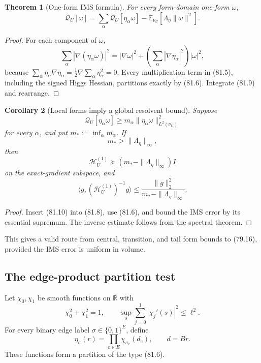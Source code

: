 \documentclass[11pt]{article}
\newtheorem{theorem}{Theorem}[section]
\newtheorem{corollary}[theorem]{Corollary}
\theoremstyle{remark}
\begin{document}
\begin{theorem}[One-form IMS formula]
\label{thm:v17v81-ims}
For every form-domain one-form \(\omega\),
\[
\boxed{
 \mathcal Q_U[\omega]
 =\sum_\alpha\mathcal Q_U[\eta_\alpha\omega]
 -\mathbb E_{\nu_U}[\Lambda_\eta\|\omega\|^2].} \tag{81.8}
\]
\end{theorem}

\begin{proof}
For each component of \(\omega\),
\[
 \sum_\alpha|\nabla(\eta_\alpha\omega)|^2
 =|\nabla\omega|^2+
 \left(\sum_\alpha|\nabla\eta_\alpha|^2\right)|\omega|^2,       \tag{81.9}
\]
because \(\sum_\alpha\eta_\alpha\nabla\eta_\alpha
=\frac12\nabla\sum_\alpha\eta_\alpha^2=0\).  Every multiplication
term in (81.5), including the signed Higgs Hessian, partitions exactly
by (81.6).  Integrate (81.9) and rearrange.
\end{proof}

\begin{corollary}[Local forms imply a global resolvent bound]
\label{cor:v17v81-local}
Suppose
\[
 \mathcal Q_U[\eta_\alpha\omega]
 \geq m_\alpha\|\eta_\alpha\omega\|_{L^2(\nu_U)}^2              \tag{81.10}
\]
for every \(\alpha\), and put
\(m_*:=\inf_\alpha m_\alpha\).  If
\[
 m_* > \|\Lambda_\eta\|_\infty,                 \tag{81.11}
\]
then
\[
 \mathscr H_U^{(1)}
 \succeq(m_*-\|\Lambda_\eta\|_\infty)I          \tag{81.12}
\]
on the exact-gradient subspace, and
\[
 \langle g,(\mathscr H_U^{(1)})^{-1}g\rangle
 \leq
 \frac{\|g\|_2^2}{m_*-\|\Lambda_\eta\|_\infty}.                 \tag{81.13}
\]
\end{corollary}

\begin{proof}
Insert (81.10) into (81.8), use (81.6), and bound the IMS error by its
essential supremum.  The inverse estimate follows from the spectral
theorem.
\end{proof}

This gives a valid route from central, transition, and tail form bounds
to (79.16), provided the IMS error is uniform in volume.

\subsection{The edge-product partition test}

Let \(\chi_0,\chi_1\) be smooth functions on \(\mathbb R\) with
\[
 \chi_0^2+\chi_1^2=1,
 \qquad
 \sup_s\sum_{j=0}^1|\chi_j'(s)|^2\leq\ell^2.      \tag{81.14}
\]
For every binary edge label
\(\sigma\in\{0,1\}^{E}\), define
\[
 \eta_\sigma(r)=\prod_{e\in E}\chi_{\sigma_e}(d_e),
 \qquad d=Br.                                     \tag{81.15}
\]
These functions form a partition of the type (81.6).
\end{document}
